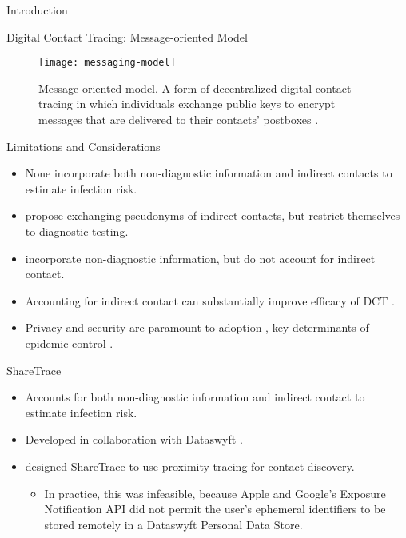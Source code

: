 \documentclass[11pt]{beamer}
\begin{document}
\begin{section}{Introduction}
\begin{frame}{Digital Contact Tracing: Message-oriented Model}
\begin{figure}
  \centering
  \texttt{[image: messaging-model]}
  \caption[Message-oriented model]{Message-oriented model. A form of decentralized digital contact tracing in which individuals exchange public keys to encrypt messages that are delivered to their contacts' postboxes \cite{Reichert2021}.}
\end{figure}
\end{frame}

\begin{frame}{Limitations and Considerations}
\begin{itemize}
  \item None incorporate both non-diagnostic information and indirect contacts to estimate infection risk.
  \pause
  \item \citet{Cherini2023} propose exchanging pseudonyms of indirect contacts, but restrict themselves to diagnostic testing.
  \pause
  \item \citet{Gupta2023} incorporate non-diagnostic information, but do not account for indirect contact.
  \pause
  \item Accounting for indirect contact can substantially improve efficacy of DCT \citep{PozoMartin2023}.
  \pause
  \item Privacy and security are paramount to adoption \citep{Oyibo2022, Afroogh2022}, key determinants of epidemic control \citep{PozoMartin2023}.
\end{itemize}
\end{frame}

\begin{frame}{ShareTrace}
\begin{itemize}
  \item Accounts for both non-diagnostic information and indirect contact to estimate infection risk.
  \item Developed in collaboration with Dataswyft \citep{Ayday2020}. 
  \item \citet{Ayday2021} designed ShareTrace to use proximity tracing for contact discovery.
    \begin{itemize}
      \item In practice, this was infeasible, because Apple and Google's Exposure Notification API did not permit the user's ephemeral identifiers to be stored remotely in a Dataswyft Personal Data Store.
    \end{itemize}
\end{itemize}
\end{frame}

\end{section}
\end{document}
